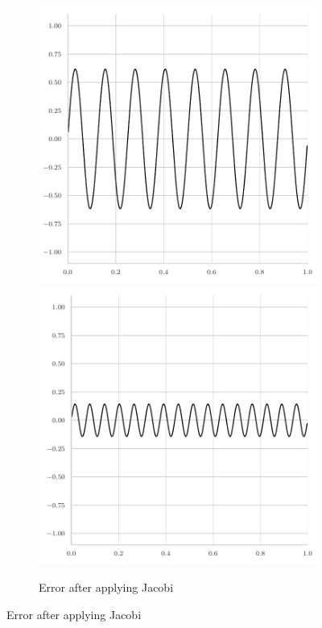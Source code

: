 \begin{figure}
\begin{subfigure}[b]{0.32\textwidth}
		\includegraphics[width=\textwidth]{figures/final_error_jacobi_16pi.pdf}
		\includegraphics[width=\textwidth]{figures/final_error_jacobi_32pi.pdf}
	\caption{Error after applying Jacobi}

\end{subfigure}
\end{figure}
